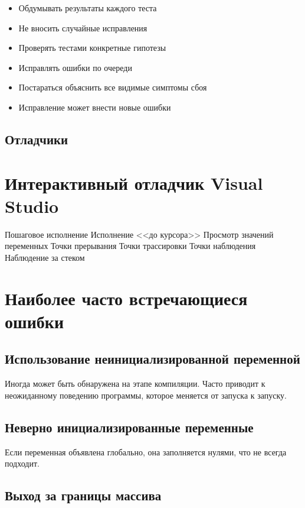 \documentclass[14pt,openany]{book}
\begin{document}
\begin{itemize}
\item Обдумывать результаты каждого теста
\item Не вносить случайные исправления
\item Проверять тестами конкретные гипотезы
\item Исправлять ошибки по очереди
\item Постараться объяснить все видимые симптомы сбоя
\item Исправление может внести новые ошибки
\end{itemize}

\section{Отладчики}

\chapter{Интерактивный отладчик Visual Studio}

Пошаговое исполнение
Исполнение <<до курсора>>
Просмотр значений переменных
Точки прерывания
Точки трассировки
Точки наблюдения
Наблюдение за стеком

\chapter{Наиболее часто встречающиеся ошибки}

\section{Использование неинициализированной переменной}

Иногда может быть обнаружена на этапе компиляции.
Часто приводит к неожиданному поведению программы, которое меняется от запуска
к запуску. 

\section{Неверно инициализированные переменные}

Если переменная объявлена глобально, она заполняется нулями, что не всегда подходит.

\section{Выход за границы массива}
\end{document}
